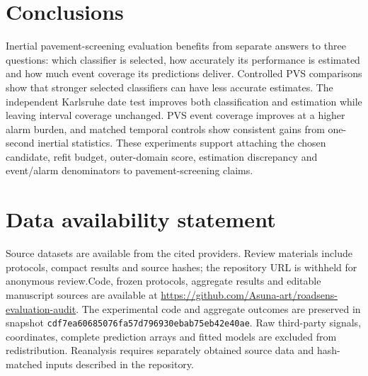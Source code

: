 \section{Conclusions}
Inertial pavement-screening evaluation benefits from separate answers to three questions: which classifier is selected, how accurately its performance is estimated and how much event coverage its predictions deliver. Controlled PVS comparisons show that stronger selected classifiers can have less accurate estimates. The independent Karlsruhe date test improves both classification and estimation while leaving interval coverage unchanged. PVS event coverage improves at a higher alarm burden, and matched temporal controls show consistent gains from one-second inertial statistics. These experiments support attaching the chosen candidate, refit budget, outer-domain score, estimation discrepancy and event/alarm denominators to pavement-screening claims.

\section*{Data availability statement}
Source datasets are available from the cited providers. \ifanonymous Review materials include protocols, compact results and source hashes; the repository URL is withheld for anonymous review.\else Code, frozen protocols, aggregate results and editable manuscript sources are available at \url{https://github.com/Asuna-art/roadsens-evaluation-audit}. The experimental code and aggregate outcomes are preserved in snapshot \texttt{cdf7ea60685076fa57d796930ebab75eb42e40ae}.\fi{} Raw third-party signals, coordinates, complete prediction arrays and fitted models are excluded from redistribution. Reanalysis requires separately obtained source data and hash-matched inputs described in the repository.


